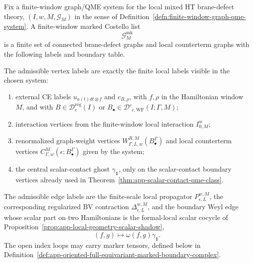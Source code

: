 \begin{defn}
\label{def:app-finite-window-marked-costello-list}
  Fix a finite-window graph/QME system for the local mixed HT
  brane-defect theory,
  \((I,w,M,\mathcal G_M)\) in the sense of
  Definition~\ref{defn:finite-window-graph-qme-system}.  A finite-window
  marked Costello list
  \[
    \mathcal G^{\mathrm{mk}}_M
  \]
  is a finite set of connected brane-defect graphs and local counterterm
  graphs with the following labels and boundary table.

  The admissible vertex labels are exactly the finite local labels visible
  in the chosen system:
  \begin{enumerate}[label=(L\arabic*)]
    \item external CE labels \(u_{a(t)dt\otimes f}\) and \(c_{B,\rho}\),
    with \(f,\rho\) in the Hamiltonian window \(M\), and with
    \(B\in\mathcal D^{\mathrm{reg}}_c(I)\) or
    \(B_\bullet\in\mathcal D'_{c,\mathrm{WF}}(I;\Gamma,M)\);
    \item interaction vertices from the finite-window local interaction
    \(I^w_{0,M}\);
    \item renormalized graph-weight vertices
    \(W^{R,M}_{\Gamma,L,w}(B^\Gamma_\bullet)\) and local counterterm
    vertices \(C^M_{\Gamma,w}(\epsilon;B^\Gamma_\bullet)\) given by
    the system;
    \item the central scalar-contact ghost \(\gamma_{\mathbf 1}\), only on
    the scalar-contact boundary vertices already used in
    Theorem~\ref{thm:app-scalar-contact-qme-class}.
  \end{enumerate}
  The admissible edge labels are the finite-scale local propagator
  \(P^{w,M}_{\epsilon,L}\), the corresponding regularized BV contraction
  \(\Delta^{w,M}_{\epsilon,L}\), and the boundary Weyl edge whose
  scalar part on two Hamiltonians is the formal-local scalar cocycle of
  Proposition~\ref{prop:app-local-geometry-scalar-shadow},
  \[
    (f,g)\longmapsto \omega(f,g)\gamma_{\mathbf 1}.
  \]
  The open index loops may carry marker tensors, defined below in
  Definition~\ref{def:app-oriented-full-equivariant-marked-boundary-complex}.


\end{defn}
